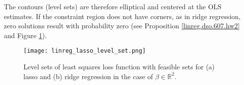 The contours (level sets) are therefore elliptical and centered at the OLS estimates. If the constraint region does not have corners, as in ridge regression, zero solutions result with probability zero (see Proposition \ref{linreg.dso.607.hw2} and Figure \ref{linreg.lasso.level.set.figure}).

\begin{figure}[htbp]
\begin{center}
\texttt{[image: linreg\_lasso\_level\_set.png]}
\caption{Level sets of least squares loss function with feasible sets for (a) lasso and (b) ridge regression in the case of \(\beta \in \mathbb{R}^2\).}
\label{linreg.lasso.level.set.figure}
\end{center}
\end{figure}


